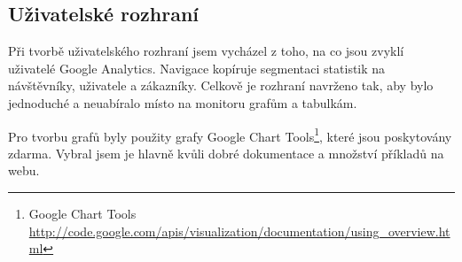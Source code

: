 \documentclass[bc,male,java,dept456]{diploma}						%
\begin{document}

\clearpage
\subsection{Uživatelské rozhraní}

Při tvorbě uživatelského rozhraní jsem vycházel z toho, na co jsou zvyklí uživatelé Google Analytics. Navigace kopíruje segmentaci statistik na návštěvníky, uživatele a zákazníky. Celkově je rozhraní navrženo tak, aby bylo jednoduché a neuabíralo místo na monitoru grafům a tabulkám.

Pro tvorbu grafů byly použity grafy Google Chart Tools\footnote{Google Chart Tools \url{http://code.google.com/apis/visualization/documentation/using_overview.html}}, které jsou poskytovány zdarma. Vybral jsem je hlavně kvůli dobré dokumentace a množství příkladů na webu.
\end{document}
